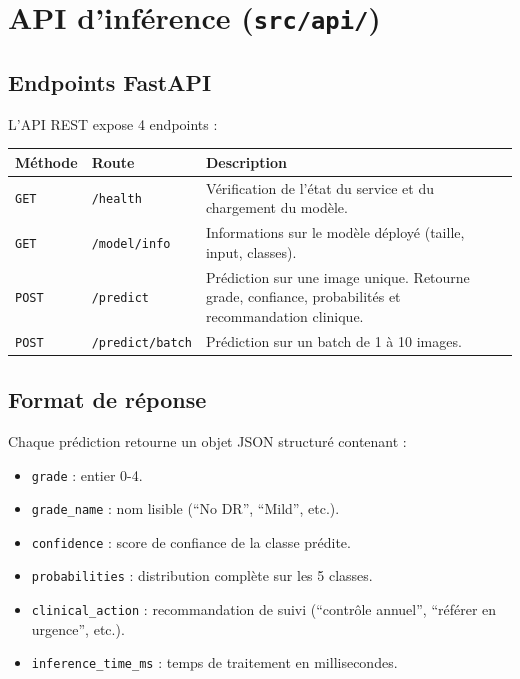 \documentclass[11pt,a4paper]{article}
\begin{document}
\section{API d'inférence (\texttt{src/api/})}

\subsection{Endpoints FastAPI}

L'API REST expose 4 endpoints :

\begin{center}
\renewcommand{\arraystretch}{1.4}
\begin{tabularx}{\textwidth}{llX}
\toprule
\textbf{Méthode} & \textbf{Route} & \textbf{Description} \\
\midrule
\texttt{GET} & \texttt{/health} & Vérification de l'état du service et du chargement du modèle. \\
\texttt{GET} & \texttt{/model/info} & Informations sur le modèle déployé (taille, input, classes). \\
\texttt{POST} & \texttt{/predict} & Prédiction sur une image unique. Retourne grade, confiance, probabilités et recommandation clinique. \\
\texttt{POST} & \texttt{/predict/batch} & Prédiction sur un batch de 1 à 10 images. \\
\bottomrule
\end{tabularx}
\end{center}

\subsection{Format de réponse}

Chaque prédiction retourne un objet JSON structuré contenant :
\begin{itemize}[leftmargin=2em]
  \item \texttt{grade} : entier 0-4.
  \item \texttt{grade\_name} : nom lisible (``No DR'', ``Mild'', etc.).
  \item \texttt{confidence} : score de confiance de la classe prédite.
  \item \texttt{probabilities} : distribution complète sur les 5 classes.
  \item \texttt{clinical\_action} : recommandation de suivi (``contrôle annuel'', ``référer en urgence'', etc.).
  \item \texttt{inference\_time\_ms} : temps de traitement en millisecondes.
\end{itemize}
\end{document}
